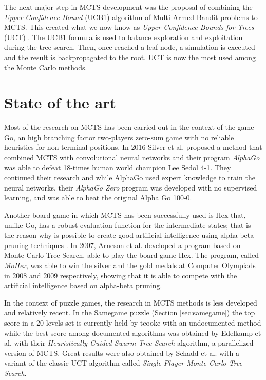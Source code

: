 \medskip\noindent
The next major step in MCTS development was the proposal of combining the \textit{Upper Confidence Bound} (UCB1) algorithm of Multi-Armed Bandit problems to MCTS. This created what we now know as \textit{Upper Confidence Bounds for Trees} (UCT) \cite{Kocsis:2006:BBM:2091602.2091633}. The UCB1 formula is used to balance exploration and exploitation during the tree search. Then, once reached a leaf node, a simulation is executed and the result is backpropagated to the root.
UCT is now the most used among the Monte Carlo methods. 

\section{State of the art}
Most of the research on MCTS has been carried out in the context of the game Go, an high branching factor two-players zero-sum game with no reliable heuristics for non-terminal positions. 
%
In 2016 Silver et al. \cite{Silver_2016} proposed a method that combined MCTS with convolutional neural networks and their program \textit{AlphaGo} was able to defeat 18-times human world champion Lee Sedol 4-1. They continued their research and while AlphaGo used expert knowledge to train the neural networks, their \textit{AlphaGo Zero} \cite{silver2017mastering} program was developed with no supervised learning, and was able to beat the original Alpha Go 100-0.

\medskip\noindent
Another board game in which MCTS has been successfully used is Hex that, unlike Go, has a robust evaluation function for the intermediate states; that is the reason why is possible to create good artificial intelligence using alpha-beta pruning
techniques \cite{journals/tciaig/ArnesonHH10}. In 2007, Arneson et al. \cite{journals/tciaig/ArnesonHH10} developed a program
based on Monte Carlo Tree Search, able to play the board game Hex. The program, called \textit{MoHex}, was able to win the silver and the gold medals at Computer Olympiads in 2008 and 2009 respectively, showing that it is able to compete with the artificial intelligence based on alpha-beta pruning.

\medskip\noindent
In the context of puzzle games, the research in MCTS methods is less developed and relatively recent. In the Samegame puzzle (Section \ref{sec:samegame}) the top score in a 20 levels set \cite{highscore} is currently held by tcooke with an undocumented method while the best score among documented algorithms was obtained by Edelkamp et al. with their \textit{Heuristically Guided Swarm Tree Search} \cite{Edelkamph} algorithm, a parallelized version of MCTS. Great results were also obtained by Schadd et al. \cite{DBLP:journals/kbs/SchaddWTU12} with a variant of the classic UCT algorithm called \textit{Single-Player Monte Carlo Tree Search}.


